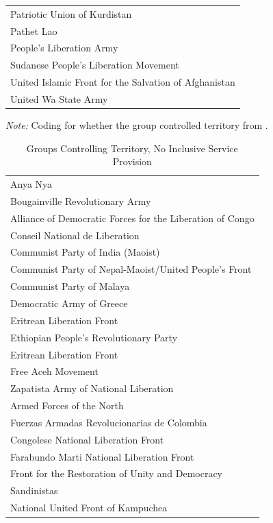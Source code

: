\documentclass[12pt, letterpaper]{article}
\begin{document}
\begin{center}
\begin{table}[htbp]
\begin{tabular}{l}
Patriotic Union of Kurdistan \\
Pathet Lao \\
People's Liberation Army \\
Sudanese People's Liberation Movement \\
United Islamic Front for the Salvation of Afghanistan \\
United Wa State Army \\
\hline \hline
\end{tabular}
\begin{tablenotes}
\raggedright \footnotesize{\textit{Note:} Coding for whether the group controlled territory from \citep{cunningham2009takes}.} 
\end{tablenotes}
\end{table}

\newpage
\begin{table}[htbp]
\centering
\small
\setcounter{table}{2}
\renewcommand\thetable{A.\Roman{table}}
\caption{Groups Controlling Territory, No Inclusive Service Provision}
 \begin{tabular}{l} 
\hline \hline
Anya Nya \\
Bougainville Revolutionary Army \\
Alliance of Democratic Forces for the Liberation of Congo \\
Conseil National de Liberation \\
Communist Party of India (Maoist) \\
Communist Party of Nepal-Maoist/United People's Front \\
Communist Party of Malaya \\
Democratic Army of Greece \\
Eritrean Liberation Front \\
Ethiopian People's Revolutionary Party \\
Eritrean Liberation Front \\
Free Aceh Movement \\
Zapatista Army of National Liberation \\
Armed Forces of the North \\
Fuerzas Armadas Revolucionarias de Colombia \\
Congolese National Liberation Front \\
Farabundo Marti National Liberation Front \\
Front for the Restoration of Unity and Democracy \\
Sandinistas \\
National United Front of Kampuchea \\

\end{tabular}
\end{table}
\end{center}
\end{document}
